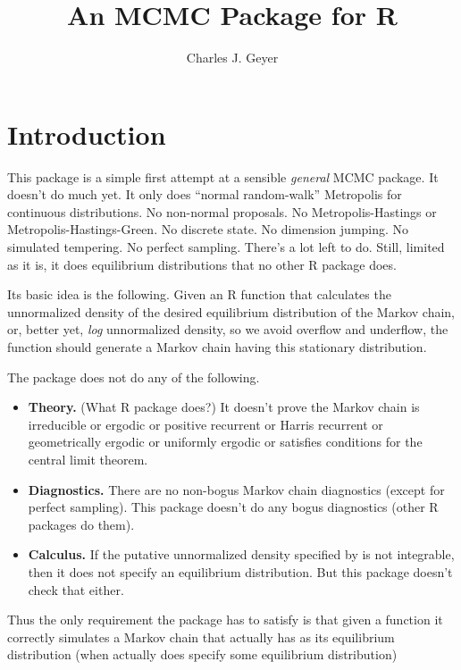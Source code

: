 \documentclass{article}
\begin{document}
\title{An MCMC Package for R}
\author{Charles J. Geyer}
\maketitle

\section{Introduction}

This package is a simple first attempt at a sensible \emph{general}
MCMC package.  It doesn't do much yet.  It only does ``normal random-walk''
Metropolis for continuous distributions.
No non-normal proposals.  No Metropolis-Hastings or Metropolis-Hastings-Green.
No discrete state.  No dimension jumping.  No simulated tempering.
No perfect sampling.  There's a lot left to do.  Still, limited as it is,
it does equilibrium distributions that no other R package does.

Its basic idea is the following.  Given an R function \verb@fred@ that
calculates the unnormalized density of the desired equilibrium distribution
of the Markov chain, or, better yet, \emph{log} unnormalized density,
so we avoid overflow and underflow, the \verb@metrop@ function should
generate a Markov chain having this stationary distribution.

The package does not do any of the following.
\begin{itemize}
\item \textbf{Theory.}  (What R package does?)  It doesn't prove the
Markov chain is irreducible or ergodic or positive recurrent or
Harris recurrent or geometrically
ergodic or uniformly ergodic or satisfies conditions for the central limit
theorem.
\item \textbf{Diagnostics.}  There are no non-bogus Markov chain diagnostics
(except for perfect sampling).  This package doesn't do any bogus diagnostics
(other R packages do them).
\item \textbf{Calculus.}  If the putative unnormalized density specified
by \verb@fred@ is not integrable, then it does not specify an equilibrium
distribution.  But this package doesn't check that either.
\end{itemize}

Thus the only requirement the package has to satisfy is that given
a function \verb@fred@ it correctly simulates a Markov chain that
actually has \verb@fred@ as its equilibrium distribution
(when \verb@fred@ actually does specify some equilibrium
distribution)
\end{document}
